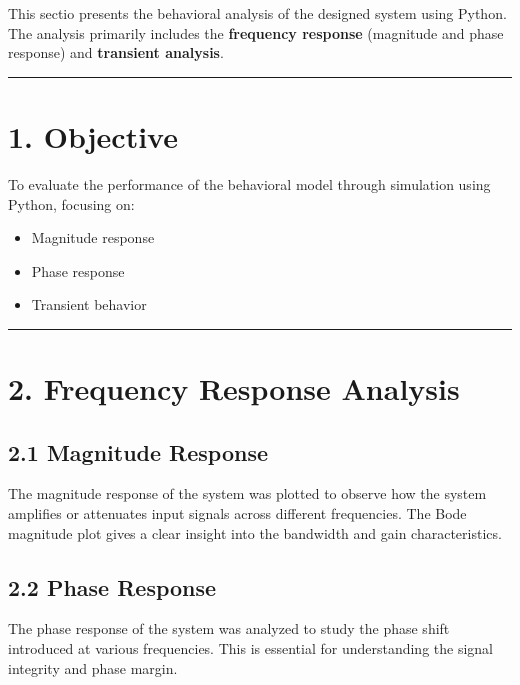 \documentclass[
  letterpaper,
  DIV=11,
  numbers=noendperiod]{scrreprt}
\providecommand{\tightlist}{%
  \setlength{\itemsep}{0pt}\setlength{\parskip}{0pt}}
\begin{document}
This sectio presents the behavioral analysis of the designed system
using Python. The analysis primarily includes the \textbf{frequency
response} (magnitude and phase response) and \textbf{transient
analysis}.

\begin{center}\rule{0.5\linewidth}{0.5pt}\end{center}

\section{1. Objective}\label{objective}

To evaluate the performance of the behavioral model through simulation
using Python, focusing on:

\begin{itemize}
\tightlist
\item
  Magnitude response
\item
  Phase response
\item
  Transient behavior
\end{itemize}

\begin{center}\rule{0.5\linewidth}{0.5pt}\end{center}

\section{2. Frequency Response
Analysis}\label{frequency-response-analysis}

\subsection{2.1 Magnitude Response}\label{magnitude-response}

The magnitude response of the system was plotted to observe how the
system amplifies or attenuates input signals across different
frequencies. The Bode magnitude plot gives a clear insight into the
bandwidth and gain characteristics.

\subsection{2.2 Phase Response}\label{phase-response}

The phase response of the system was analyzed to study the phase shift
introduced at various frequencies. This is essential for understanding
the signal integrity and phase margin.
\end{document}
